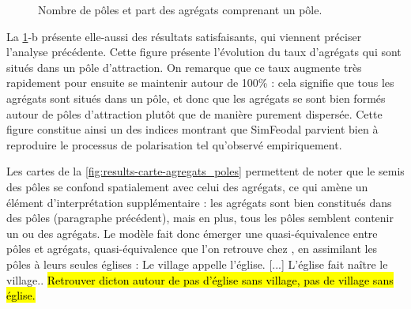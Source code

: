\begin{figure}[H]
	\centering
	\hspace{5pt}
	\caption[Nombre de pôles et part des agrégats comprenant un pôle.]{Nombre de pôles et part des agrégats comprenant un pôle.}
	\label{fig:results-nb-poles-agregats}
\end{figure}

La \cref{fig:results-nb-poles-agregats}-b présente elle-aussi des résultats satisfaisants, qui viennent préciser l'analyse précédente.
Cette figure présente l'évolution du taux d'agrégats qui sont situés dans un pôle d'attraction.
On remarque que ce taux augmente très rapidement pour ensuite se maintenir autour de 100\% : cela signifie que tous les agrégats sont situés dans un pôle, et donc que les agrégats se sont bien formés autour de pôles d'attraction plutôt que de manière purement dispersée.
Cette figure constitue ainsi un des indices montrant que SimFeodal parvient bien à reproduire le processus de polarisation tel qu'observé empiriquement.

Les cartes de la \cref{fig:results-carte-agregats_poles} permettent de noter que le semis des pôles se confond spatialement avec celui des agrégats, ce qui amène un élément d'interprétation supplémentaire : les agrégats sont bien constitués dans des pôles (paragraphe précédent), mais en plus, tous les pôles semblent contenir un ou des agrégats.
Le modèle fait donc émerger une quasi-équivalence entre pôles et agrégats, quasi-équivalence que l'on retrouve chez \textcite[27-28]{le1976eglise}, en assimilant les pôles à leurs seules églises : \og Le village appelle l'église. [...] L'église fait naître le village.\fg{}.
\hl{Retrouver dicton autour de \og pas d'église sans village, pas de village sans église\fg{}.}

